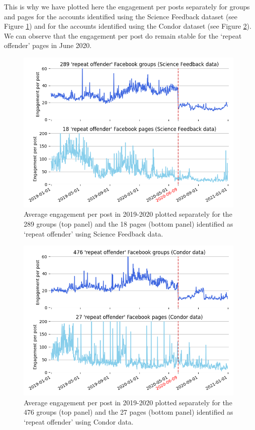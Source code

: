 \documentclass[review]{elsarticle}
\begin{document}
{This is why we have plotted here the engagement per posts separately for groups and pages for the accounts identified using the Science Feedback dataset (see Figure \ref{engagement_groups_and_pages_sf}) and for the accounts identified using the Condor dataset (see Figure \ref{engagement_groups_and_pages_condor}). 
We can observe that the engagement per post do remain stable for the `repeat offender' pages in June 2020.

\begin{figure}[!h]
\centering
\includegraphics[scale=0.5]{./../figure/supplementary_engagement_groups_and_pages_sf.png}
\caption{
Average engagement per post in 2019-2020 plotted separately for the 289 groups (top panel) and the 18 pages (bottom panel) identified as `repeat offender' using Science Feedback data.
}
\label{engagement_groups_and_pages_sf}
\end{figure}

\begin{figure}[!h]
\centering
\includegraphics[scale=0.5]{./../figure/supplementary_engagement_groups_and_pages_condor.png}
\caption{
Average engagement per post in 2019-2020 plotted separately for the 476 groups (top panel) and the 27 pages (bottom panel) identified as `repeat offender' using Condor data.
}
\label{engagement_groups_and_pages_condor}
\end{figure}

}
\end{document}
